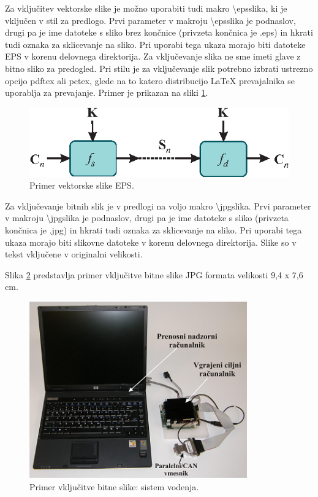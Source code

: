 Za vključitev vektorske slike je možno uporabiti tudi makro \textbackslash epsslika, ki je vključen v stil za predlogo. Prvi parameter v makroju \textbackslash epsslika je podnaslov, drugi pa je ime datoteke s sliko brez končnice (privzeta končnica je .eps) in hkrati tudi oznaka za sklicevanje na sliko. Pri uporabi tega ukaza morajo biti datoteke EPS v korenu delovnega direktorija. Za vključevanje slika ne sme imeti glave z bitno sliko za predogled. Pri stilu je za vključevanje slik potrebno izbrati ustrezno opcijo pdftex ali pctex, glede na to katero distribucijo LaTeX prevajalnika se uporablja za prevajanje. Primer je prikazan na sliki \ref{oblika_signalov_2}.

\begin{figure}[h]
	\centering
	\includegraphics[width=0.75\columnwidth]{slike/vektorska_slika_2.eps}
	\caption{\label{oblika_signalov_2} Primer vektorske slike EPS.}
\end{figure}

Za vključevanje bitnih slik je v predlogi na voljo makro \textbackslash jpgslika. Prvi parameter v makroju \textbackslash jpgslika je podnaslov, drugi pa je ime datoteke s sliko (privzeta končnica je .jpg) in hkrati tudi oznaka za sklicevanje na sliko. Pri uporabi tega ukaza morajo biti slikovne datoteke v korenu delovnega direktorija. Slike so v tekst vključene v originalni velikosti.

Slika \ref{bitna_slika} predstavlja primer vključitve bitne slike JPG formata velikosti 9,4 x 7,6 cm.

\begin{figure}[h]
	\centering
	\includegraphics[width=9.4cm, height=7.6cm]{slike/bitna_slika.png}
	\caption{\label{bitna_slika} Primer vključitve bitne slike: sistem vodenja.}
\end{figure}

